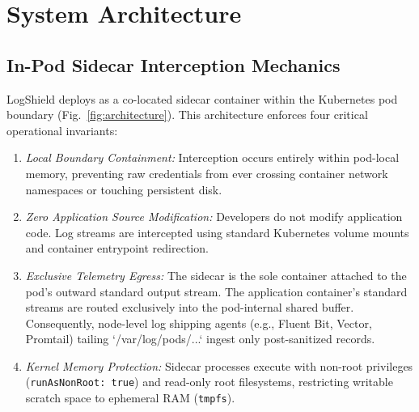 \documentclass[conference]{IEEEtran}
\begin{document}
\section{System Architecture}

\subsection{In-Pod Sidecar Interception Mechanics}
LogShield deploys as a co-located sidecar container within the Kubernetes pod boundary (Fig.~\ref{fig:architecture}). This architecture enforces four critical operational invariants:
\begin{enumerate}
    \item \textit{Local Boundary Containment:} Interception occurs entirely within pod-local memory, preventing raw credentials from ever crossing container network namespaces or touching persistent disk.
    \item \textit{Zero Application Source Modification:} Developers do not modify application code. Log streams are intercepted using standard Kubernetes volume mounts and container entrypoint redirection.
    \item \textit{Exclusive Telemetry Egress:} The sidecar is the sole container attached to the pod's outward standard output stream. The application container's standard streams are routed exclusively into the pod-internal shared buffer. Consequently, node-level log shipping agents (e.g., Fluent Bit, Vector, Promtail) tailing `/var/log/pods/...` ingest only post-sanitized records.
    \item \textit{Kernel Memory Protection:} Sidecar processes execute with non-root privileges (\texttt{runAsNonRoot: true}) and read-only root filesystems, restricting writable scratch space to ephemeral RAM (\texttt{tmpfs}).
\end{enumerate}
\end{document}
